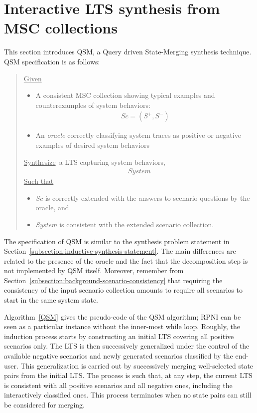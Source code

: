 \section{Interactive LTS synthesis from MSC collections\label{section:lts-induction-from-mscs}}

This section introduces QSM, a Query driven State-Merging synthesis technique. QSM specification is as follows:

\begin{quote}
\underline{Given}
\begin{itemize}
\item A consistent MSC collection showing typical examples and counterexamples of system behaviors:
\begin{align*}Sc = (S^+,S^-)\end{align*}
\item An \emph{oracle} correctly classifying system traces as positive or negative examples of desired system behaviors
\end{itemize}
\underline{Synthesize}~a LTS capturing system behaviors,
\begin{align*}System\end{align*}
\underline{Such that}
\begin{itemize}
\item $Sc$ is correctly extended with the answers to scenario questions by the oracle, and
\item \emph{System} is consistent with the extended scenario collection.
\end{itemize}
\end{quote}

The specification of QSM is similar to the synthesis problem statement in Section~\ref{subsection:inductive-synthesis-statement}. The main differences are related to the presence of the oracle and the fact that the decomposition step is not implemented by QSM itself. Moreover, remember from Section~\ref{subsection:background-scenario-consistency} that requiring the consistency of the input scenario collection amounts to require all scenarios to start in the same system state.

Algorithm~\ref{QSM} gives the pseudo-code of the \textsc{QSM} algorithm; RPNI can be seen as a particular instance without the inner-most while loop. Roughly, the induction process starts by constructing an initial LTS covering all positive scenarios only. The LTS is then successively generalized under the control of the available negative scenarios and newly generated scenarios classified by the end-user. This generalization is carried out by successively merging well-selected state pairs from the initial LTS. The process is such that, at any step, the current LTS is consistent with all positive scenarios and all negative ones, including the interactively classified ones. This process terminates when no state pairs can still be considered for merging.

